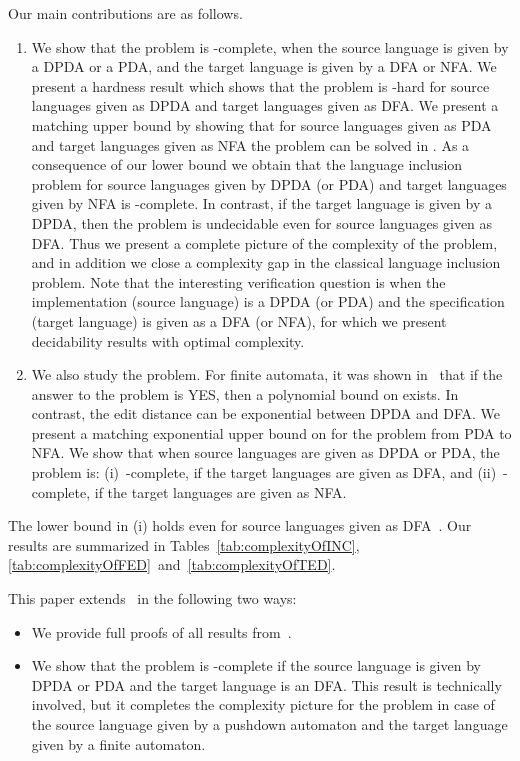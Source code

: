 \documentclass{CSML}
\begin{document}
\smallskip{}
Our main contributions are as follows.
\begin{enumerate}
\item We show that the  problem is -complete, when the source 
language is given by a DPDA or a PDA, and the target language is given by 
a DFA or NFA. 
We present a hardness result which shows that the  problem is -hard 
for source languages given as DPDA and target languages given as DFA. 
We present a matching upper bound by showing that for source languages given 
as PDA and target languages given as NFA the problem can be solved in . 
As a consequence of our lower bound we obtain that the language inclusion 
problem for source languages given by DPDA (or PDA) and target languages given by NFA is -complete.
In contrast, if the target language is given by a DPDA, then the  
problem is undecidable even for source languages given as DFA.
Thus we present a complete picture of the complexity of the  problem, and 
in addition we close a complexity gap in the classical language inclusion problem.
Note that the interesting verification question is when the implementation 
(source language) is a DPDA (or PDA) and the specification (target language)
is given as a DFA (or NFA), for which we present decidability results
with optimal complexity.

\item We also study the  problem.
For finite automata, it was shown in~\cite{riveros,boundedRiveros} that if the answer 
to the  problem is YES, then a polynomial bound on  exists.
In contrast, the edit distance can be exponential between DPDA and DFA.
We present a matching exponential upper bound on  for the  problem 
from PDA to NFA.
We show that when source languages are given as DPDA or PDA, 
the  problem is:
(i)~-complete, if the target languages are given as DFA, and
(ii)~-complete, if the target languages are given as NFA.
\end{enumerate}
The lower bound in (i) holds even for source languages given as DFA~\cite{boundedRiveros}.
Our results are summarized in Tables~\ref{tab:complexityOfINC}, \ref{tab:complexityOfFED}~and~\ref{tab:complexityOfTED}.

This paper extends~\cite{editDistanceConference} in the following two ways:
\begin{itemize}
\item We provide full proofs of all results from~\cite{editDistanceConference}.
\item We show that the  problem is -complete if the source language is given by 
DPDA or PDA and the target language is an DFA. This result is technically involved, but it completes 
the complexity picture for the  problem in case of 
the source language given by a pushdown automaton and the target language given by a finite automaton. 
\end{itemize}
\end{document}
